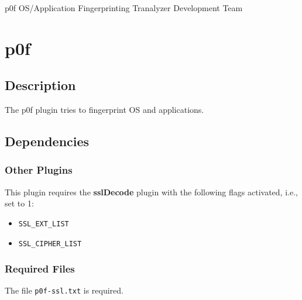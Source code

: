 \documentclass[documentation]{subfiles}
\begin{document}
\trantitle
    {p0f} %
    {OS/Application Fingerprinting} %
    {Tranalyzer Development Team} %

\section{p0f}\label{s:p0f}

\subsection{Description}
The p0f plugin tries to fingerprint OS and applications.

\subsection{Dependencies}

\subsubsection{Other Plugins}
This plugin requires the {\bf sslDecode} plugin with the following flags activated, i.e., set to 1:
\begin{itemize}
    \item {\tt SSL\_EXT\_LIST}
    \item {\tt SSL\_CIPHER\_LIST}
\end{itemize}

\subsubsection{Required Files}
The file {\tt p0f-ssl.txt} is required.
\end{document}
